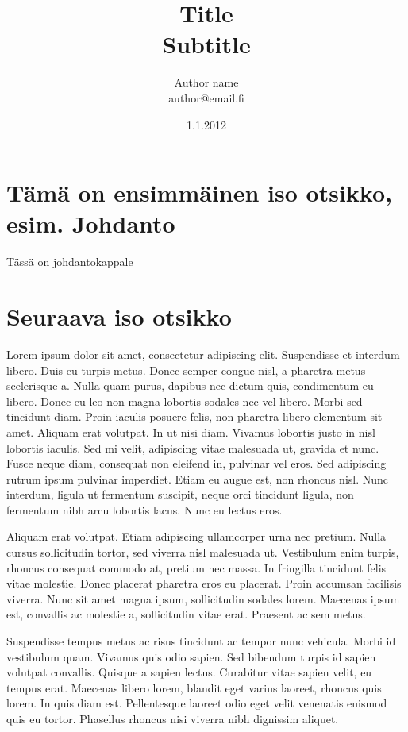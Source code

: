\documentclass[a4paper]{article}
\begin{document}
\title{\huge Title \\ \large Subtitle}
\date{1.1.2012}
\author{Author name \\ author@email.fi}
\maketitle

\large

\section{Tämä on ensimmäinen iso otsikko, esim. Johdanto}

Tässä on johdantokappale

\section{Seuraava iso otsikko}

Lorem ipsum dolor sit amet, consectetur adipiscing elit. Suspendisse et interdum libero. Duis eu turpis metus. Donec semper congue nisl, a pharetra metus scelerisque a. Nulla quam purus, dapibus nec dictum quis, condimentum eu libero. Donec eu leo non magna lobortis sodales nec vel libero. Morbi sed tincidunt diam. Proin iaculis posuere felis, non pharetra libero elementum sit amet. Aliquam erat volutpat. In ut nisi diam. Vivamus lobortis justo in nisl lobortis iaculis. Sed mi velit, adipiscing vitae malesuada ut, gravida et nunc. Fusce neque diam, consequat non eleifend in, pulvinar vel eros. Sed adipiscing rutrum ipsum pulvinar imperdiet. Etiam eu augue est, non rhoncus nisl. Nunc interdum, ligula ut fermentum suscipit, neque orci tincidunt ligula, non fermentum nibh arcu lobortis lacus. Nunc eu lectus eros.

Aliquam erat volutpat. Etiam adipiscing ullamcorper urna nec pretium. Nulla cursus sollicitudin tortor, sed viverra nisl malesuada ut. Vestibulum enim turpis, rhoncus consequat commodo at, pretium nec massa. In fringilla tincidunt felis vitae molestie. Donec placerat pharetra eros eu placerat. Proin accumsan facilisis viverra. Nunc sit amet magna ipsum, sollicitudin sodales lorem. Maecenas ipsum est, convallis ac molestie a, sollicitudin vitae erat. Praesent ac sem metus.

Suspendisse tempus metus ac risus tincidunt ac tempor nunc vehicula. Morbi id vestibulum quam. Vivamus quis odio sapien. Sed bibendum turpis id sapien volutpat convallis. Quisque a sapien lectus. Curabitur vitae sapien velit, eu tempus erat. Maecenas libero lorem, blandit eget varius laoreet, rhoncus quis lorem. In quis diam est. Pellentesque laoreet odio eget velit venenatis euismod quis eu tortor. Phasellus rhoncus nisi viverra nibh dignissim aliquet.
\end{document}
